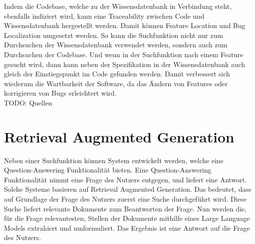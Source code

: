Indem die Codebase, welche zu der Wissensdatenbank in Verbindung steht, ebenfalls indiziert wird, kann eine Traceability zwischen Code und Wissensdatenbank hergestellt werden.
Damit können Feature Location und Bug Localization umgesetzt werden.
So kann die Suchfunktion nicht nur zum Durchsuchen der Wissensdatenbank verwendet werden, sondern auch zum Durchsuchen der Codebase.
Und wenn in der Suchfunktion nach einem Feature gesucht wird, dann kann neben der Spezifikation in der Wissensdatenbank auch gleich der Einstiegspunkt im Code gefunden werden.
Damit verbessert sich wiederum die Wartbarkeit der Software, da das Ändern von Features oder korrigieren von Bugs erleichtert wird.\\
TODO: Quellen

\section{Retrieval Augmented Generation}
Neben einer Suchfunktion können System entwickelt werden, welche eine Question-Answering Funktionalität bieten.
Eine Question-Answering Funktionalität nimmt eine Frage des Nutzers entgegen, und liefert eine Antwort.
Solche Systeme basieren auf Retrieval Augmented Generation.
Das bedeutet, dass auf Grundlage der Frage des Nutzers zuerst eine Suche durchgeführt wird.
Diese Suche liefert relevante Dokumente zum Beantworten der Frage.
Nun werden die, für die Frage relevantesten, Stellen der Dokumente mithilfe eines Large Language Models extrahiert und umformuliert.
Das Ergebnis ist eine Antwort auf die Frage des Nutzers. 
